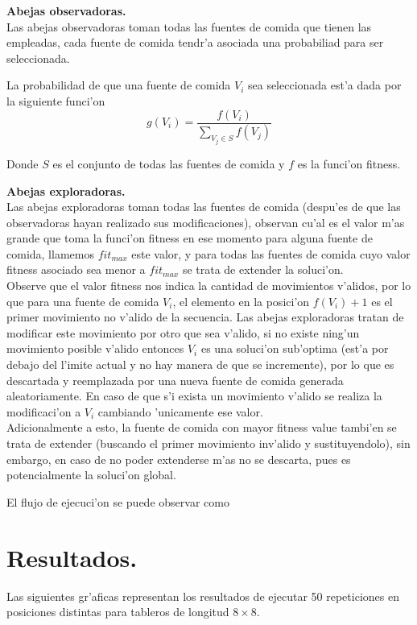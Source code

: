 \documentclass[12pt]{article}
\begin{document}
    \textbf{Abejas observadoras.}\\
    Las abejas observadoras toman todas las fuentes de comida que tienen las empleadas, cada fuente
    de comida tendr'a asociada una probabiliad para ser seleccionada.

    La probabilidad de que una fuente de comida $V_i$ sea seleccionada est'a dada por la
    siguiente funci'on
    \begin{equation}\label{eq: selection_function}
        g( V_i ) =  \dfrac{ f(V_i ) } { \displaystyle \sum_{ V_j \in S } f(V_j) }
    \end{equation}

    Donde $S$ es el conjunto de todas las fuentes de comida y $f$ es la funci'on fitness.

    \textbf{Abejas exploradoras.}\\
    Las abejas exploradoras toman todas las fuentes de comida (despu'es de que las observadoras hayan realizado
    sus modificaciones), observan cu'al es el valor m'as grande que toma la funci'on fitness en ese momento para alguna fuente
    de comida,
    llamemos $fit_{max}$ este valor, y para todas las fuentes de comida cuyo
    valor fitness asociado sea menor a $fit_{max}$ se trata de extender la soluci'on.\\
    Observe que el valor fitness nos indica la cantidad de movimientos v'alidos, por lo que
    para una fuente de comida $V_i$, el elemento en la posici'on $f(V_i) + 1$
    es el primer movimiento no v'alido de la secuencia. Las abejas exploradoras tratan de modificar
    este movimiento por otro que sea v'alido, si no existe ning'un movimiento posible v'alido
    entonces $V_i$ es una soluci'on sub'optima (est'a por debajo del l'imite actual y no hay manera
    de que se incremente), por lo que es descartada y reemplazada por una nueva
    fuente de comida generada aleatoriamente. En caso de que s'i exista un movimiento v'alido se realiza la
    modificaci'on a $V_i$ cambiando 'unicamente ese valor. \\

    Adicionalmente a esto, la fuente de comida con mayor fitness value tambi'en se trata de extender (buscando el primer
    movimiento inv'alido y sustituyendolo), sin embargo, en caso de no poder extenderse m'as no se descarta, pues
    es potencialmente la soluci'on global.


    El flujo de ejecuci'on se puede observar como




    \section{Resultados.}
    Las siguientes gr'aficas representan los resultados de ejecutar 50 repeticiones en posiciones distintas
    para tableros de longitud $8 \times 8$.
\end{document}
